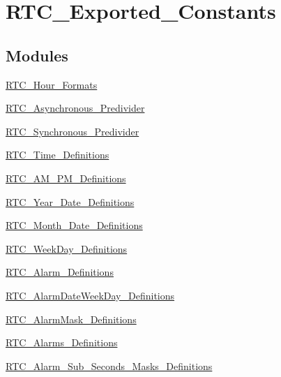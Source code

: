 \hypertarget{group___r_t_c___exported___constants}{\section{R\-T\-C\-\_\-\-Exported\-\_\-\-Constants}
\label{group___r_t_c___exported___constants}
}
\subsection*{Modules}
\begin{DoxyCompactItemize}
\item 
\hyperlink{group___r_t_c___hour___formats}{R\-T\-C\-\_\-\-Hour\-\_\-\-Formats}
\item 
\hyperlink{group___r_t_c___asynchronous___predivider}{R\-T\-C\-\_\-\-Asynchronous\-\_\-\-Predivider}
\item 
\hyperlink{group___r_t_c___synchronous___predivider}{R\-T\-C\-\_\-\-Synchronous\-\_\-\-Predivider}
\item 
\hyperlink{group___r_t_c___time___definitions}{R\-T\-C\-\_\-\-Time\-\_\-\-Definitions}
\item 
\hyperlink{group___r_t_c___a_m___p_m___definitions}{R\-T\-C\-\_\-\-A\-M\-\_\-\-P\-M\-\_\-\-Definitions}
\item 
\hyperlink{group___r_t_c___year___date___definitions}{R\-T\-C\-\_\-\-Year\-\_\-\-Date\-\_\-\-Definitions}
\item 
\hyperlink{group___r_t_c___month___date___definitions}{R\-T\-C\-\_\-\-Month\-\_\-\-Date\-\_\-\-Definitions}
\item 
\hyperlink{group___r_t_c___week_day___definitions}{R\-T\-C\-\_\-\-Week\-Day\-\_\-\-Definitions}
\item 
\hyperlink{group___r_t_c___alarm___definitions}{R\-T\-C\-\_\-\-Alarm\-\_\-\-Definitions}
\item 
\hyperlink{group___r_t_c___alarm_date_week_day___definitions}{R\-T\-C\-\_\-\-Alarm\-Date\-Week\-Day\-\_\-\-Definitions}
\item 
\hyperlink{group___r_t_c___alarm_mask___definitions}{R\-T\-C\-\_\-\-Alarm\-Mask\-\_\-\-Definitions}
\item 
\hyperlink{group___r_t_c___alarms___definitions}{R\-T\-C\-\_\-\-Alarms\-\_\-\-Definitions}
\item 
\hyperlink{group___r_t_c___alarm___sub___seconds___masks___definitions}{R\-T\-C\-\_\-\-Alarm\-\_\-\-Sub\-\_\-\-Seconds\-\_\-\-Masks\-\_\-\-Definitions}
\item 

\end{DoxyCompactItemize}
